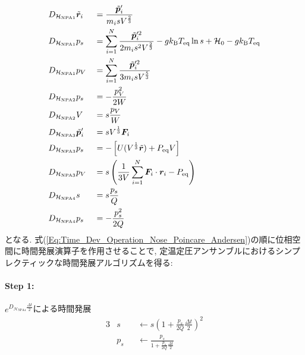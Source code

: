 \begin{alignat}{3}
  &
  D_{\mathcal{H}_{\mathrm{NPA}1}} \Tilde{\bm{r}}_{i}
  &&=
  \frac{\Tilde{\bm{p}}_{i}^{\prime}}{m_{i} s V^{\frac{2}{3}}}
  \\
  &
  D_{\mathcal{H}_{\mathrm{NPA}1}} p_{s}
  &&=
  \sum_{i=1}^{N}
  \frac{\Tilde{\bm{p}}_{i}^{\prime 2}}{2m_{i}s^{2}V^{\frac{2}{3}}}
  -
  g k_{\mathrm{B}} T_{\mathrm{eq}} \ln s
  +
  \mathcal{H}_{0}
  -
  g k_{\mathrm{B}} T_{\mathrm{eq}}
  \\
  &
  D_{\mathcal{H}_{\mathrm{NPA}1}} p_{V}
  &&=
  \sum_{i=1}^{N}
  \frac{\Tilde{\bm{p}}_{i}^{\prime 2}}{3m_{i} s V^{\frac{5}{3}}}
  \\
  &
  D_{\mathcal{H}_{\mathrm{NPA}2}} p_{s}
  &&=
  -\frac{p_{V}^{2}}{2W}
  \\
  &
  D_{\mathcal{H}_{\mathrm{NPA}2}} V
  &&=
  s \frac{p_{V}}{W}
  \\
  &
  D_{\mathcal{H}_{\mathrm{NPA}3}} \Tilde{\bm{p}}_{i}^{\prime}
  &&=
  s V^{\frac{1}{3}} \bm{F}_{i}
  \\
  &
  D_{\mathcal{H}_{\mathrm{NPA}3}} p_{s}
  &&=
  -
  \left[
    U(V^{\frac{1}{3}} \Tilde{\bm{r}}) + P_{\mathrm{eq}}V
  \right]
  \\
  &
  D_{\mathcal{H}_{\mathrm{NPA}3}} p_{V}
  &&=
  s
  \left(
    \frac{1}{3V}
    \sum_{i=1}^{N} \bm{F}_{i} \cdot \bm{r}_{i}
    -
    P_{\mathrm{eq}}
  \right)
  \\
  &
  D_{\mathcal{H}_{\mathrm{NPA}4}} s
  &&=
  s \frac{p_{s}}{Q}
  \\
  &
  D_{\mathcal{H}_{\mathrm{NPA}4}} p_{s}
  &&=
  - \frac{p_{s}^{2}}{2Q}
\end{alignat}
となる. 式(\ref{Eq:Time_Dev_Operation_Nose_Poincare_Andersen})の順に位相空間に時間発展演算子を作用させることで, 定温定圧アンサンブルにおけるシンプレクティックな時間発展アルゴリズムを得る:

\paragraph{Step 1:}
$e^{D_{\mathcal{H}_{\mathrm{NPA}4}} \frac{\Delta t}{2}}$による時間発展
\begin{alignat}{3}
  & s && \gets
  s
  \left(
    1 + \frac{p_{s}}{2Q} \frac{\Delta t}{2}
  \right)^{2}
  \\
  & p_{s} && \gets
  \frac{p_{s}}{1 + \frac{p_{s}}{2Q} \frac{\Delta t}{2}}
\end{alignat}

